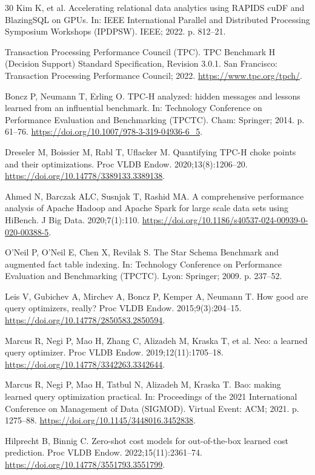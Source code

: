 \documentclass[10pt,a4paper]{article}
\begin{document}
{\begin{thebibliography}{30}
Kim K, et al. Accelerating relational data analytics using RAPIDS cuDF and BlazingSQL on GPUs. In: IEEE International Parallel and Distributed Processing Symposium Workshops (IPDPSW). IEEE; 2022. p. 812--21.

Transaction Processing Performance Council (TPC). TPC Benchmark H (Decision Support) Standard Specification, Revision 3.0.1. San Francisco: Transaction Processing Performance Council; 2022. \url{https://www.tpc.org/tpch/}.

Boncz P, Neumann T, Erling O. TPC-H analyzed: hidden messages and lessons learned from an influential benchmark. In: Technology Conference on Performance Evaluation and Benchmarking (TPCTC). Cham: Springer; 2014. p. 61--76. \url{https://doi.org/10.1007/978-3-319-04936-6_5}.

Dreseler M, Boissier M, Rabl T, Uflacker M. Quantifying TPC-H choke points and their optimizations. Proc VLDB Endow. 2020;13(8):1206--20. \url{https://doi.org/10.14778/3389133.3389138}.

Ahmed N, Barczak ALC, Susnjak T, Rashid MA. A comprehensive performance analysis of Apache Hadoop and Apache Spark for large scale data sets using HiBench. J Big Data. 2020;7(1):110. \url{https://doi.org/10.1186/s40537-024-00939-0-020-00388-5}.

O'Neil P, O'Neil E, Chen X, Revilak S. The Star Schema Benchmark and augmented fact table indexing. In: Technology Conference on Performance Evaluation and Benchmarking (TPCTC). Lyon: Springer; 2009. p. 237--52.

Leis V, Gubichev A, Mirchev A, Boncz P, Kemper A, Neumann T. How good are query optimizers, really? Proc VLDB Endow. 2015;9(3):204--15. \url{https://doi.org/10.14778/2850583.2850594}.

Marcus R, Negi P, Mao H, Zhang C, Alizadeh M, Kraska T, et al. Neo: a learned query optimizer. Proc VLDB Endow. 2019;12(11):1705--18. \url{https://doi.org/10.14778/3342263.3342644}.

Marcus R, Negi P, Mao H, Tatbul N, Alizadeh M, Kraska T. Bao: making learned query optimization practical. In: Proceedings of the 2021 International Conference on Management of Data (SIGMOD). Virtual Event: ACM; 2021. p. 1275--88. \url{https://doi.org/10.1145/3448016.3452838}.

Hilprecht B, Binnig C. Zero-shot cost models for out-of-the-box learned cost prediction. Proc VLDB Endow. 2022;15(11):2361--74. \url{https://doi.org/10.14778/3551793.3551799}.


\end{thebibliography}}
\end{document}
